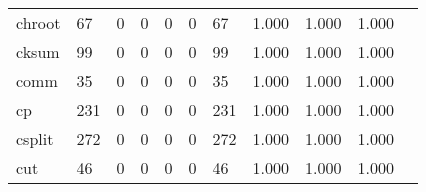 \begin{longtable}{lp{1.2cm}p{1.2cm}p{1.2cm}p{1.2cm}p{1.2cm}p{1.2cm}p{1.2cm}p{1.2cm}p{1.2cm}p{1.2cm}}
chroot    &                                    67 &                                                  0 &                                                  0 &                                                  0 &                                                  0 &                                                 67 &                                              1.000 &                                              1.000 &                                              1.000 \\
cksum     &                                    99 &                                                  0 &                                                  0 &                                                  0 &                                                  0 &                                                 99 &                                              1.000 &                                              1.000 &                                              1.000 \\
comm      &                                    35 &                                                  0 &                                                  0 &                                                  0 &                                                  0 &                                                 35 &                                              1.000 &                                              1.000 &                                              1.000 \\
cp        &                                   231 &                                                  0 &                                                  0 &                                                  0 &                                                  0 &                                                231 &                                              1.000 &                                              1.000 &                                              1.000 \\
csplit    &                                   272 &                                                  0 &                                                  0 &                                                  0 &                                                  0 &                                                272 &                                              1.000 &                                              1.000 &                                              1.000 \\
cut       &                                    46 &                                                  0 &                                                  0 &                                                  0 &                                                  0 &                                                 46 &                                              1.000 &                                              1.000 &                                              1.000 \\

\end{longtable}
